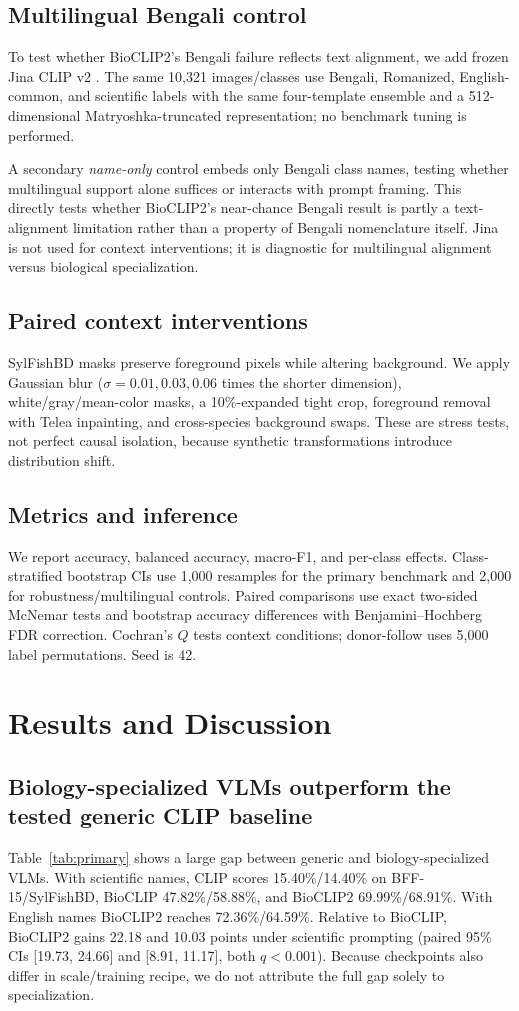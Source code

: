 \documentclass{article}
\begin{document}
\subsection{Multilingual Bengali control}
To test whether BioCLIP2's Bengali failure reflects text alignment, we add frozen Jina CLIP v2 \citep{koukounas2024jinaclipv2}. The same 10,321 images/classes use Bengali, Romanized, English-common, and scientific labels with the same four-template ensemble and a 512-dimensional Matryoshka-truncated representation; no benchmark tuning is performed.

A secondary \emph{name-only} control embeds only Bengali class names, testing whether multilingual support alone suffices or interacts with prompt framing. This directly tests whether BioCLIP2's near-chance Bengali result is partly a text-alignment limitation rather than a property of Bengali nomenclature itself. Jina is not used for context interventions; it is diagnostic for multilingual alignment versus biological specialization.

\subsection{Paired context interventions}
SylFishBD masks preserve foreground pixels while altering background. We apply Gaussian blur ($\sigma=0.01,0.03,0.06$ times the shorter dimension), white/gray/mean-color masks, a 10\%-expanded tight crop, foreground removal with Telea inpainting, and cross-species background swaps. These are stress tests, not perfect causal isolation, because synthetic transformations introduce distribution shift.

\subsection{Metrics and inference}
We report accuracy, balanced accuracy, macro-F1, and per-class effects. Class-stratified bootstrap CIs use 1,000 resamples for the primary benchmark and 2,000 for robustness/multilingual controls. Paired comparisons use exact two-sided McNemar tests and bootstrap accuracy differences with Benjamini--Hochberg FDR correction. Cochran's $Q$ tests context conditions; donor-follow uses 5,000 label permutations. Seed is 42.

\section{Results and Discussion}
\subsection{Biology-specialized VLMs outperform the tested generic CLIP baseline}
Table~\ref{tab:primary} shows a large gap between generic and biology-specialized VLMs. With scientific names, CLIP scores 15.40\%/14.40\% on BFF-15/SylFishBD, BioCLIP 47.82\%/58.88\%, and BioCLIP2 69.99\%/68.91\%. With English names BioCLIP2 reaches 72.36\%/64.59\%. Relative to BioCLIP, BioCLIP2 gains 22.18 and 10.03 points under scientific prompting (paired 95\% CIs [19.73, 24.66] and [8.91, 11.17], both $q<0.001$). Because checkpoints also differ in scale/training recipe, we do not attribute the full gap solely to specialization.
\end{document}
